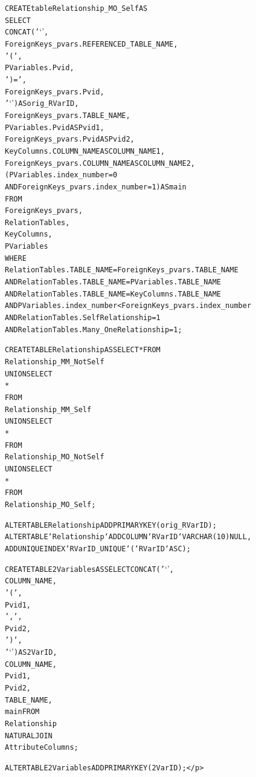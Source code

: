 \documentclass{IEEEtran}
\begin{document}
\begin{appendix}
\begin{scriptsize}
\begin{alltt}
CREATE table Relationship_MO_Self AS
SELECT 
    CONCAT('`',
            ForeignKeys_pvars.REFERENCED_TABLE_NAME,
            '(',
            PVariables.Pvid,
            ')=',
            ForeignKeys_pvars.Pvid,
            '`') AS orig_RVarID,
    ForeignKeys_pvars.TABLE_NAME,
    PVariables.Pvid AS Pvid1,
    ForeignKeys_pvars.Pvid AS Pvid2,
    KeyColumns.COLUMN_NAME AS COLUMN_NAME1,
    ForeignKeys_pvars.COLUMN_NAME AS COLUMN_NAME2,
    (PVariables.index_number = 0
        AND ForeignKeys_pvars.index_number = 1) AS main
FROM
    ForeignKeys_pvars,
    RelationTables,
    KeyColumns,
    PVariables
WHERE
    RelationTables.TABLE_NAME = ForeignKeys_pvars.TABLE_NAME
        AND RelationTables.TABLE_NAME = PVariables.TABLE_NAME
        AND RelationTables.TABLE_NAME = KeyColumns.TABLE_NAME
        AND PVariables.index_number < ForeignKeys_pvars.index_number
        AND RelationTables.SelfRelationship = 1
        AND RelationTables.Many_OneRelationship = 1;

CREATE TABLE Relationship AS SELECT * FROM  
Relationship_MM_NotSelf    
UNION SELECT            
*                   
FROM
Relationship_MM_Self 
UNION SELECT 
*
FROM
Relationship_MO_NotSelf 
UNION SELECT 
*
FROM
Relationship_MO_Self;

ALTER TABLE Relationship ADD PRIMARY KEY (orig_RVarID);
ALTER TABLE `Relationship` ADD COLUMN `RVarID` VARCHAR(10) NULL , 
ADD UNIQUE INDEX `RVarID_UNIQUE` (`RVarID` ASC) ; 


CREATE TABLE 2Variables AS SELECT CONCAT('`',
        COLUMN_NAME,
        '(',
        Pvid1,
        ',',
        Pvid2,
        ')',
        '`') AS 2VarID,
COLUMN_NAME,
Pvid1,
Pvid2,
TABLE_NAME,
main FROM
Relationship
    NATURAL JOIN
AttributeColumns;

ALTER TABLE 2Variables ADD PRIMARY KEY (2VarID);</p>\end{alltt}

%
%
\end{scriptsize}



\end{appendix}
\end{document}
